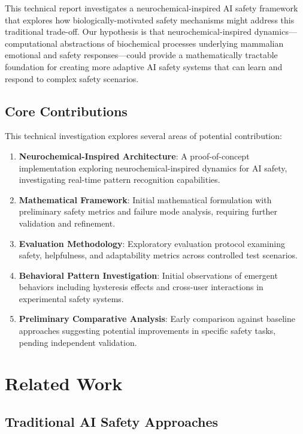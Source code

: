 \documentclass[12pt]{article}
\begin{document}
This technical report investigates a neurochemical-inspired AI safety framework that explores how biologically-motivated safety mechanisms might address this traditional trade-off. Our hypothesis is that neurochemical-inspired dynamics—computational abstractions of biochemical processes underlying mammalian emotional and safety responses—could provide a mathematically tractable foundation for creating more adaptive AI safety systems that can learn and respond to complex safety scenarios.

\subsection{Core Contributions}

This technical investigation explores several areas of potential contribution:

\begin{enumerate}
\item \textbf{Neurochemical-Inspired Architecture}: A proof-of-concept implementation exploring neurochemical-inspired dynamics for AI safety, investigating real-time pattern recognition capabilities.

\item \textbf{Mathematical Framework}: Initial mathematical formulation with preliminary safety metrics and failure mode analysis, requiring further validation and refinement.

\item \textbf{Evaluation Methodology}: Exploratory evaluation protocol examining safety, helpfulness, and adaptability metrics across controlled test scenarios.

\item \textbf{Behavioral Pattern Investigation}: Initial observations of emergent behaviors including hysteresis effects and cross-user interactions in experimental safety systems.

\item \textbf{Preliminary Comparative Analysis}: Early comparison against baseline approaches suggesting potential improvements in specific safety tasks, pending independent validation.
\end{enumerate}

\section{Related Work}

\subsection{Traditional AI Safety Approaches}
\end{document}
